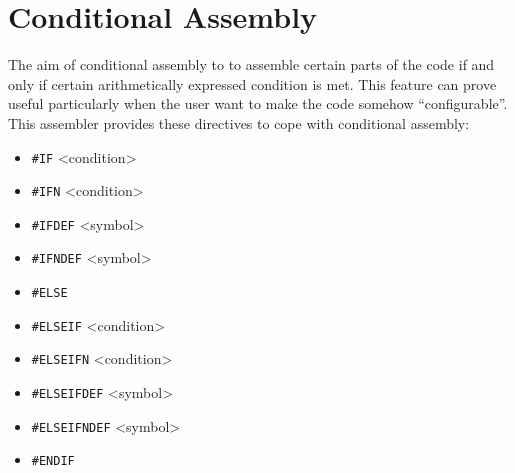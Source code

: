 \clearpage
\section{Conditional Assembly}
    The aim of conditional assembly to to assemble certain parts of the code if and only if certain arithmetically expressed condition is met. This feature can prove useful particularly when the user want to make the code somehow ``configurable''. This assembler provides these directives to cope with conditional assembly:

    \begin{itemize}
        \item \texttt{\#IF}     <condition>
        \item \texttt{\#IFN}    <condition>
        \item \texttt{\#IFDEF}  <symbol>
        \item \texttt{\#IFNDEF} <symbol>
        \item \texttt{\#ELSE}
        \item \texttt{\#ELSEIF}     <condition>
        \item \texttt{\#ELSEIFN}    <condition>
        \item \texttt{\#ELSEIFDEF}  <symbol>
        \item \texttt{\#ELSEIFNDEF} <symbol>
        \item \texttt{\#ENDIF}
    \end{itemize}

